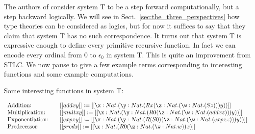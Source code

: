 The authors of \cite{Girard:1989} consider system T to be a step
forward computationally, but a step backward logically.  We will see
in Sect.~\ref{sec:the_three_perspectives} how type theories can be
considered as logics, but for now it suffices to say that they claim
that system T has no such correspondence.  It turns out that system T
is expressive enough to define every primitive recursive function.  In
fact we can encode every ordinal from 0 to $\epsilon_0$ in system T.
This is quite an improvement from STLC.  We now pause to give a few
example terms corresponding to interesting functions and some example
computations.

\begin{example}
  \label{ex:T_functions}
  Some interesting functions in system T:
  \begin{center}
    \begin{math}
      \begin{array}{lll}
        \text{Addition:} & & [[add x y]] := 
             [[\x:Nat.(\y:Nat.(R x (\z:Nat.(\w:Nat.(S z))) y))]]\\
        \text{Multiplication:} & & 
             [[mult x y]] := [[\x:Nat.(\y:Nat.(R 0 (\z:Nat.(\w:Nat.(add x z))) y))]]\\ 
        \text{Exponentiation:} & & 
             [[exp x y]] := [[\x:Nat.(\y:Nat.(R (S 0) (\z:Nat.(\w:Nat.(exp x z))) y))]]\\ 
        \text{Predecessor:} & & 
             [[pred x]] := [[\x:Nat.(R 0 (\z:Nat.(\w:Nat.w)) x)]]\\ 
      \end{array}
    \end{math}
  \end{center}
\end{example}


